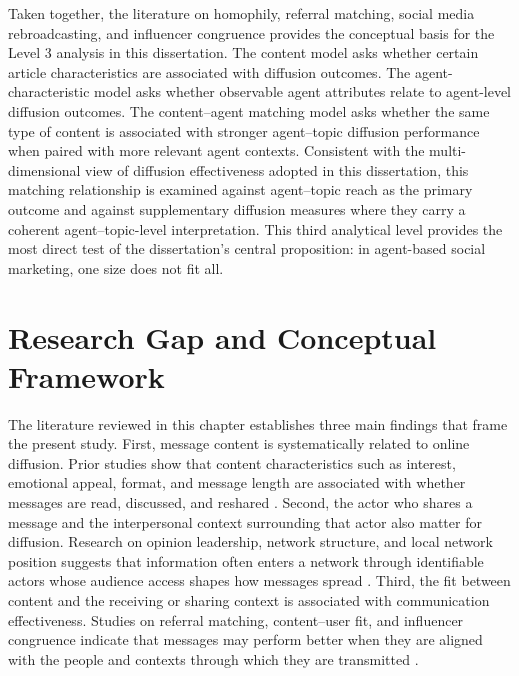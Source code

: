 Taken together, the literature on homophily, referral matching, social media rebroadcasting, and influencer congruence provides the conceptual basis for the Level 3 analysis in this dissertation. The content model asks whether certain article characteristics are associated with diffusion outcomes. The agent-characteristic model asks whether observable agent attributes relate to agent-level diffusion outcomes. The content–agent matching model asks whether the same type of content is associated with stronger agent–topic diffusion performance when paired with more relevant agent contexts. Consistent with the multi-dimensional view of diffusion effectiveness adopted in this dissertation, this matching relationship is examined against agent–topic reach as the primary outcome and against supplementary diffusion measures where they carry a coherent agent–topic-level interpretation. This third analytical level provides the most direct test of the dissertation's central proposition: in agent-based social marketing, one size does not fit all.

\section{Research Gap and Conceptual Framework}
\label{sec:2-5-research-gap-and-conceptual-framework}

The literature reviewed in this chapter establishes three main findings that frame the present study. First, message content is systematically related to online diffusion. Prior studies show that content characteristics such as interest, emotional appeal, format, and message length are associated with whether messages are read, discussed, and reshared \parencite{berger2011,bergermilkman2012,heath2001,lahuertaotero2018}. Second, the actor who shares a message and the interpersonal context surrounding that actor also matter for diffusion. Research on opinion leadership, network structure, and local network position suggests that information often enters a network through identifiable actors whose audience access shapes how messages spread \parencite{katz1955,katona2011,yoganarasimhan2012}. Third, the fit between content and the receiving or sharing context is associated with communication effectiveness. Studies on referral matching, content–user fit, and influencer congruence indicate that messages may perform better when they are aligned with the people and contexts through which they are transmitted \parencite{belanche2021,breves2019,vandenbulte2018,zhang2017}.

